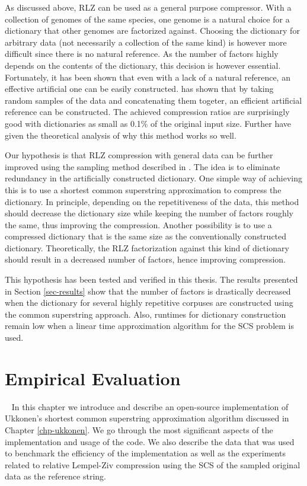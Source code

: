 \documentclass[english,twoside,censored,csm,algorithms-track-2020]{HYthesisML}
\theoremstyle{plain}
\theoremstyle{definition}
\begin{document}
As discussed above, RLZ can be used as a general purpose compressor. With a collection of
genomes of the same species, one genome is a natural choice for a dictionary that other genomes are
factorized against. Choosing the dictionary for arbitrary data (not necessarily a collection of the
same kind) is however more difficult since there is no natural reference. As the number of factors
highly depends on the contents of the dictionary, this decision is however essential. Fortunately, it has been shown
that even with a lack of a natural reference, an effective artificial one can be easily constructed.
\citep{Hoobin11} has shown that by taking random samples of the data and concatenating them togeter,
an efficient  artificial reference can be constructed. The achieved compression ratios are surprisingly
good with dictionaries as small as 0.1\% of the original input size. Further \citep{Gagie16} have
given the theoretical analysis of why this method works so well.

Our hypothesis is that RLZ compression with general data can be further improved using the
sampling method described in \citep{Hoobin11}. The idea is to eliminate redundancy in the
artificially constructed dictionary. One simple way of achieving this is to use a shortest common
superstring approximation to compress the dictionary. In principle, depending on the repetitiveness
of the data, this method should decrease the dictionary size while keeping the number of factors
roughly the same, thus improving the compression. Another possibility is to use a compressed
dictionary that is the same size as the conventionally constructed dictionary. Theoretically, the
RLZ factorization against this kind of dictionary should result in a decreased number of factors,
hence improving compression.

This hypothesis has been tested and verified in this thesis. The results presented in Section
\ref{sec-results} show that the number of factors is drastically decreased when the dictionary
for several highly repetitive corpuses are constructed using the common superstring approach.
Also, runtimes for dictionary construction remain low when a linear time approximation
algorithm for the SCS problem is used.

\chapter{Empirical Evaluation}~\label{chp-results}
In this chapter we introduce and describe an open-source implementation of Ukkonen's shortest
common superstring
approximation algorithm discussed in Chapter \ref{chp-ukkonen}. We go through the most significant
aspects of the implementation and usage of the code. We also describe the data that was used to
benchmark the efficiency of the implementation as well as the experiments related to
relative Lempel-Ziv compression using the SCS of the sampled original data as the reference string.
\end{document}
